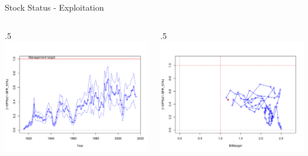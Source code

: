 \documentclass[ignorenonframetext,]{beamer}
\def\begincols{\begin{columns}}
\def\begincol{\begin{column}}
\def\endcol{\end{column}}
\def\endcols{\end{columns}}
\begin{document}
\begin{frame}{Stock Status - Exploitation}

\begincols
 \begincol{.5\textwidth}
\includegraphics{r4ss/plots_mod1/SPR3_ratiointerval.png} \endcol
 \begincol{.5\textwidth}
\includegraphics{r4ss/plots_mod1/SPR4_phase.png} \endcol
\endcols

\end{frame}
\end{document}
